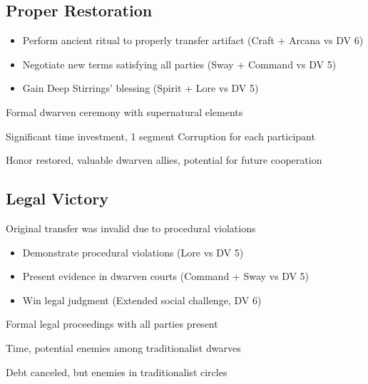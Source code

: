 \documentclass[11pt]{article}
\newenvironment{resolution}[1]{\begin{description}[leftmargin=*,style=standard]\item[\textbf{#1}]}{\end{description}}
\begin{document}
\subsection{Proper Restoration}
\begin{resolution}{Proper Restoration}
\item[Requirements:] 
  \begin{itemize}
    \item Perform ancient ritual to properly transfer artifact (Craft + Arcana vs DV 6)
    \item Negotiate new terms satisfying all parties (Sway + Command vs DV 5)
    \item Gain Deep Stirrings' blessing (Spirit + Lore vs DV 5)
  \end{itemize}
\item[Procedure:] Formal dwarven ceremony with supernatural elements
\item[Costs:] Significant time investment, 1 segment Corruption for each participant
\item[Outcome:] Honor restored, valuable dwarven allies, potential for future cooperation
\end{resolution}

\subsection{Legal Victory}
\begin{resolution}{Legal Victory}
\item[Discovery:] Original transfer was invalid due to procedural violations
\item[Requirements:] 
  \begin{itemize}
    \item Demonstrate procedural violations (Lore vs DV 5)
    \item Present evidence in dwarven courts (Command + Sway vs DV 5)
    \item Win legal judgment (Extended social challenge, DV 6)
  \end{itemize}
\item[Procedure:] Formal legal proceedings with all parties present
\item[Costs:] Time, potential enemies among traditionalist dwarves
\item[Outcome:] Debt canceled, but enemies in traditionalist circles
\end{resolution}
\end{document}
